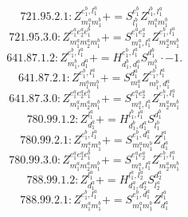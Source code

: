 \documentclass[letterpaper,10pt,fleqn,leqno,onecolumn]{article}
\begin{document}
\begin{equation} \;\;\;\;\;\;  721.95.2.1: Z^{e_{1}^{b},l_{1}^{a}}_{m_{1}^{a}m_{1}^{b}}+=S^{e_{1}^{b}}_{l_{1}^{b}}Z^{l_{1}^{b},l_{1}^{a}}_{m_{1}^{a}m_{1}^{b}} \end{equation}
\begin{equation} \;\;\;\;\;\;  721.95.3.0: Z^{e_{1}^{a}e_{2}^{a}e_{1}^{b}}_{m_{1}^{a}m_{2}^{a}m_{1}^{b}}+=S^{e_{1}^{a}e_{2}^{a}}_{m_{1}^{a},l_{1}^{a}}Z^{e_{1}^{b},l_{1}^{a}}_{m_{2}^{a}m_{1}^{b}} \end{equation}
\begin{equation} \;\;\;\;\;\;  641.87.1.2: Z^{e_{1}^{b},l_{1}^{a}}_{m_{1}^{b},d_{1}^{a}}+=H^{e_{1}^{b},l_{1}^{a}}_{d_{1}^{b},d_{1}^{a}}S^{d_{1}^{b}}_{m_{1}^{b}}\cdot -1. \end{equation}
\begin{equation} \;\;\;\;\;\;  641.87.2.1: Z^{e_{1}^{b},l_{1}^{a}}_{m_{1}^{a}m_{1}^{b}}+=S^{d_{1}^{a}}_{m_{1}^{a}}Z^{e_{1}^{b},l_{1}^{a}}_{m_{1}^{b},d_{1}^{a}} \end{equation}
\begin{equation} \;\;\;\;\;\;  641.87.3.0: Z^{e_{1}^{a}e_{2}^{a}e_{1}^{b}}_{m_{1}^{a}m_{2}^{a}m_{1}^{b}}+=S^{e_{1}^{a}e_{2}^{a}}_{m_{1}^{a},l_{1}^{a}}Z^{e_{1}^{b},l_{1}^{a}}_{m_{2}^{a}m_{1}^{b}} \end{equation}
\begin{equation} \;\;\;\;\;\;  780.99.1.2: Z^{l_{1}^{a}}_{d_{1}^{a}}+=H^{l_{1}^{b},l_{1}^{a}}_{d_{1}^{b},d_{1}^{a}}S^{d_{1}^{b}}_{l_{1}^{b}} \end{equation}
\begin{equation} \;\;\;\;\;\;  780.99.2.1: Z^{e_{1}^{b},l_{1}^{a}}_{m_{1}^{a}m_{1}^{b}}+=S^{e_{1}^{b},d_{1}^{a}}_{m_{1}^{a}m_{1}^{b}}Z^{l_{1}^{a}}_{d_{1}^{a}} \end{equation}
\begin{equation} \;\;\;\;\;\;  780.99.3.0: Z^{e_{1}^{a}e_{2}^{a}e_{1}^{b}}_{m_{1}^{a}m_{2}^{a}m_{1}^{b}}+=S^{e_{1}^{a}e_{2}^{a}}_{m_{1}^{a},l_{1}^{a}}Z^{e_{1}^{b},l_{1}^{a}}_{m_{2}^{a}m_{1}^{b}} \end{equation}
\begin{equation} \;\;\;\;\;\;  788.99.1.2: Z^{l_{1}^{a}}_{d_{1}^{a}}+=H^{l_{1}^{a},l_{2}^{a}}_{d_{1}^{a},d_{2}^{a}}S^{d_{2}^{a}}_{l_{2}^{a}} \end{equation}
\begin{equation} \;\;\;\;\;\;  788.99.2.1: Z^{e_{1}^{b},l_{1}^{a}}_{m_{1}^{a}m_{1}^{b}}+=S^{e_{1}^{b},d_{1}^{a}}_{m_{1}^{a}m_{1}^{b}}Z^{l_{1}^{a}}_{d_{1}^{a}} \end{equation}
\end{document}

